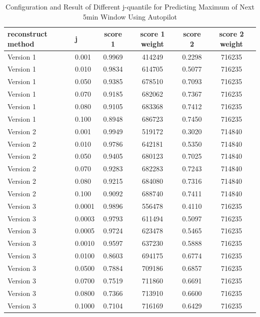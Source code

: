\documentclass{article}
\begin{document}
\begin{table}[htbp]
  \begin{center}
    \caption{Configuration and Result of Different j-quantile for Predicting Maximum of Next 5min Window Using Autopilot}
    \label{tab:tab1.11.1}
    \begin{tabular}{l|l|*{4}{c}}
      \textbf{reconstruct method} & \textbf{j} & \textbf{score 1} & \textbf{score 1 weight} & \textbf{score 2} & \textbf{score 2 weight} \\
      \hline
      Version 1 & 0.001 & 0.9969 & 414249 & 0.2298 & 716235\\
      Version 1 & 0.010 & 0.9834 & 614705 & 0.5077 & 716235\\
      Version 1 & 0.050 & 0.9385 & 678510 & 0.7093 & 716235\\
      Version 1 & 0.070 & 0.9185 & 682062 & 0.7367 & 716235\\
      Version 1 & 0.080 & 0.9105 & 683368 & 0.7412 & 716235\\
      Version 1 & 0.100 & 0.8948 & 686723 & 0.7450 & 716235\\
      Version 2 & 0.001 & 0.9949 & 519172 & 0.3020 & 714840\\
      Version 2 & 0.010 & 0.9786 & 642181 & 0.5350 & 714840\\
      Version 2 & 0.050 & 0.9405 & 680123 & 0.7025 & 714840\\
      Version 2 & 0.070 & 0.9283 & 682283 & 0.7243 & 714840\\
      Version 2 & 0.080 & 0.9215 & 684080 & 0.7316 & 714840\\
      Version 2 & 0.100 & 0.9092 & 688740 & 0.7411 & 714840\\
      Version 3 & 0.0001 & 0.9896 & 556478 & 0.4110 & 716235\\
      Version 3 & 0.0003 & 0.9793 & 611494 & 0.5097 & 716235\\
      Version 3 & 0.0005 & 0.9724 & 623478 & 0.5465 & 716235\\
      Version 3 & 0.0010 & 0.9597 & 637230 & 0.5888 & 716235\\
      Version 3 & 0.0100 & 0.8603 & 694175 & 0.6774 & 716235\\
      Version 3 & 0.0500 & 0.7884 & 709186 & 0.6857 & 716235\\
      Version 3 & 0.0700 & 0.7519 & 711860 & 0.6691 & 716235\\
      Version 3 & 0.0800 & 0.7366 & 713910 & 0.6600 & 716235\\
      Version 3 & 0.1000 & 0.7104 & 716169 & 0.6429 & 716235\\
    \end{tabular}
  \end{center}
\end{table}
\end{document}
